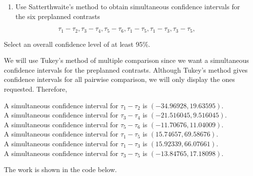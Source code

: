 \documentclass[12pt,]{article}
\providecommand{\tightlist}{%
  \setlength{\itemsep}{0pt}\setlength{\parskip}{0pt}}
\begin{document}
\begin{enumerate}
\def\labelenumi{(\alph{enumi})}
\setcounter{enumi}{1}
\tightlist
\item
  Use Satterthwaite's method to obtain simultaneous confidence intervals
  for the six preplanned contrasts
\end{enumerate}

\[\tau_1 -\tau_2, \tau_3 -\tau_4, \tau_5 -\tau_6, \tau_1 -\tau_5, \tau_1 -\tau_3, \tau_3 -\tau_5,\]

Select an overall confidence level of at least 95\%.

We will use Tukey's method of multiple comparison since we want a
simultaneous confidence intervals for the preplanned contrasts. Although
Tukey's method gives confidence intervals for all pairwise comparison,
we will only display the ones requested. Therefore,

\begin{center}
A simultaneous confidence interval for $\tau_1 -\tau_2$ is $(-34.96928,19.63595)$.\\
A simultaneous confidence interval for $\tau_3 -\tau_4$ is $(-21.516045,9.516045)$.\\
A simultaneous confidence interval for $\tau_5 -\tau_6$ is $(-11.70676,11.04009)$.\\
A simultaneous confidence interval for $\tau_1 -\tau_5$ is $(15.74657,69.58676)$.\\
A simultaneous confidence interval for $\tau_1 -\tau_3$ is $(15.92339,66.07661)$.\\
A simultaneous confidence interval for $\tau_3 -\tau_5$ is $(-13.84765,17.18098)$.
\end{center}

The work is shown in the code below.
\end{document}
